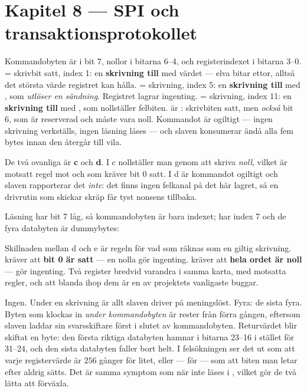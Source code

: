 \section*{Kapitel 8 --- SPI och transaktionsprotokollet}

Kommandobyten är  i bit 7, nollor i bitarna 6--4, och registerindexet i bitarna 3--0.
  = skrivbit satt, index 1: en \textbf{skrivning till } med värdet
 --- elva bitar ettor, alltså det största värde registret kan hålla.
  = skrivning, index 5: en \textbf{skrivning till } med
, som \emph{utlöser en sändning}. Registret lagrar ingenting.
  = skrivning, index 11: en \textbf{skrivning till } med
, som nollställer felbiten.
  är : skrivbiten satt, men \emph{också} bit 6, som är
reserverad och måste vara noll. Kommandot är ogiltigt --- ingen skrivning verkställs, ingen
läsning låses --- och slaven konsumerar ändå alla fem bytes innan den återgår till vila.

De två ovanliga är \textbf{c} och \textbf{d}. I c nollställer man genom att skriva \emph{noll},
vilket är motsatt regel mot  och  som kräver bit 0 satt. I d är
kommandot ogiltigt och slaven rapporterar det \emph{inte}: det finns ingen felkanal på det här
lagret, så en drivrutin som skickar skräp får tyst nonsens tillbaka.

 Läsning har bit 7 låg, så kommandobyten är bara indexet;  har index 7 och de
fyra databyten är dummybytes: 
 
 
 
 

Skillnaden mellan d och e är regeln för vad som räknas som en giltig skrivning. 
kräver att \textbf{bit 0 är satt} --- en nolla gör ingenting.  kräver att
\textbf{hela ordet är noll} ---  gör ingenting. Två register bredvid varandra i samma
karta, med motsatta regler, och att blanda ihop dem är en av projektets vanligaste buggar.

 Ingen. Under en skrivning är allt slaven driver på  meningslöst.
 Fyra: de sista fyra. Byten som klockas in \emph{under kommandobyten} är rester från förra
gången, eftersom slaven laddar sin svarsskiftare först i slutet av kommandobyten.
 Returvärdet blir skiftat en byte: den första riktiga databyten hamnar i bitarna 23--16
i stället för 31--24, och den sista databyten faller bort helt. I felsökningen ser det ut som att
varje registervärde är $256$ gånger för litet, eller --- för  --- som att biten man
letar efter aldrig sätts. Det är samma symptom som när  inte läses i
, vilket gör de två lätta att förväxla.

